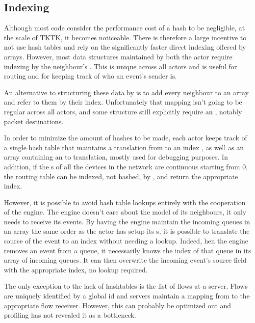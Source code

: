 \subsection{Indexing} \label{rustasim-indexing}

Although most code consider the performance cost of a hash to be negligible, at the scale of TKTK, it becomes noticeable.
There is therefore a large incentive to not use hash tables and rely on the significantly faster direct indexing offered by arrays.
However, most data structures maintained by both the actor require indexing by the neighbour's .
This  is unique across all actors and is useful for routing and for keeping track of who an event's sender is.

An alternative to structuring these data by  is to add every neighbour to an array and refer to them by their index.
Unfortunately that mapping isn't going to be regular across all actors, and some structure still explicitly require an , notably packet destinations.

In order to minimize the amount of hashes to be made, each actor keeps track of a single hash table that maintains a translation from  to an index , as well as an array containing an  to  translation, mostly used for debugging purposes.
In addition, if the s of all the devices in the network are continuous starting from 0, the routing table can be indexed, not hashed, by , and return the appropriate index.

However, it is possible to avoid hash table lookups entirely with the cooperation of the engine.
The engine doesn't care about the model  of its neighbours, it only needs to receive its events.
By having the engine maintain the incoming queues in an array the same order as the actor has setup its s, it is possible to translate the source  of the event to an index without needing a lookup.
Indeed, hen the engine removes an event from a queue, it necessarily knows the index of that queue in its array of incoming queues.
It can then overwrite the incoming event's source field with the appropriate index, no lookup required.

The only exception to the lack of hashtables is the list of flows at a server.
Flows are uniquely identified by a global id and servers maintain a mapping from  to the appropriate flow receiver.
However, this can probably be optimized out and profiling has not revealed it as a bottleneck.

